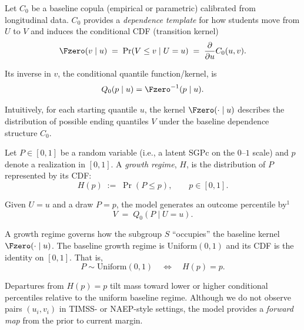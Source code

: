 \documentclass[10pt]{article}
\begin{document}
\noindent
\begin{minipage}[t]{3.75in}
  \vspace{0.05in}
  \hspace{0.15in}%
  \begin{minipage}{3.45in}
    \small\raggedright\color{bodyGrey}

    Let $C_0$ be a baseline copula (empirical or parametric) calibrated from longitudinal data.
    $C_0$ provides a \emph{dependence template} for how students move 
    from $U$ to $V$ and induces the conditional CDF (transition kernel)
    \[
      \Fzero(v\mid u)\;=\;\Pr(V\le v\mid U=u)\;=\;\frac{\partial}{\partial u}C_0(u,v).
    \]

    \vspace{1pt}
    Its inverse in $v$, the conditional quantile function/kernel, is
    \[
      Q_0(p\mid u)=\Fzero^{-1}(p\mid u).
    \]

    \vspace{1pt}
    Intuitively, for each starting quantile $u$, the kernel $\Fzero(\cdot\mid u)$ 
    describes the distribution of possible ending quantiles $V$ under the baseline 
    dependence structure $C_0$.

    \vspace{4pt}
    Let $P\in[0,1]$ be a random variable (i.e., a latent SGPc on the $0$--$1$ scale) 
    and $p$ denote a realization in $[0,1]$. A \emph{growth regime}, $H$, is the 
    distribution of $P$ represented by its CDF:
    \[
      H(p)\;:=\;\Pr(P\le p),\qquad p\in[0,1].
    \]

    \vspace{1pt}
    Given $U=u$ and a draw $P=p$, the model generates an outcome percentile by$^\mbox{1}$
    \[
      V \;=\; Q_0(P\mid U=u).
    \]

    \vspace{1pt}
    A growth regime governs how the subgroup $S$ ``occupies'' the baseline 
    kernel $\Fzero(\cdot\mid u)$. The baseline growth regime
    is Uniform$(0,1)$ and its CDF is the identity on $[0,1]$. That is, 
    \[
      P \sim \mbox{Uniform}(0,1) \quad \Longleftrightarrow \quad H(p)=p.
    \]

    \vspace{1pt}
    Departures from $H(p)=p$ tilt mass toward lower or higher conditional 
    percentiles relative to the uniform baseline regime. Although we 
    do not observe pairs $(u_i,v_i)$ in TIMSS- or NAEP-style settings, 
    the model provides a \emph{forward map} from the prior to current margin.


\end{minipage}
\end{minipage}
\end{document}
